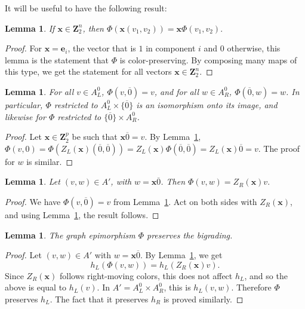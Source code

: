 \documentclass[12pt,twoside,singlespace]{article}
\numberwithin{equation}{section}
\newtheorem{lem}[equation]{Lemma}
\theoremstyle{definition}
\newcommand{\ZZ}{\mathbf{Z}}
\renewcommand{\vec}[1]{\mathbf{#1}}
\begin{document}
It will be useful to have the following result:
\begin{lem}
\label{lem:gphi}
If $\vec{x}\in \ZZ_2^n$, then $\Phi(\vec{x}(v_1,v_2))=\vec{x}\Phi(v_1,v_2).$
\end{lem}
\begin{proof}
For $\vec{x}=\vec{e}_i$, the vector that is $1$ in component $i$ and $0$ otherwise, this lemma is the statement that $\Phi$ is color-preserving.  By composing many maps of this type, we get the statement for all vectors $\vec{x}\in \ZZ_2^n$.
\end{proof}

\begin{lem}
\label{lem:phisides}
For all $v\in A_L^0$, $\Phi(v,\overline{0})=v$, and for all $w\in A_R^0$, $\Phi(\overline{0},w)=w$.  In particular, $\Phi$ restricted to $A_L^0\times\{\overline{0}\}$ is an isomorphism onto its image, and likewise for $\Phi$ restricted to $\{\overline{0}\}\times A_R^0$.
\end{lem}
\begin{proof}
Let $\vec{x}\in \ZZ_2^p$ be such that $\vec{x}\overline{0}=v$.  By Lemma~\ref{lem:gphi}, $\Phi(v,0) = \Phi(Z_L(\vec{x})(\overline{0},\overline{0})) = Z_L(\vec{x})\Phi(\overline{0},\overline{0})=Z_L(\vec{x})\overline{0}=v$.  The proof for $w$ is similar.
\end{proof}

\begin{lem}
\label{lem:phiformula}
Let $(v,w)\in A'$, with $w=\vec{x}\overline{0}$.  Then $\Phi(v,w)=Z_R(\vec{x})v.$
\end{lem}
\begin{proof}
We have $\Phi(v,\overline{0})=v$ from Lemma~\ref{lem:phisides}.  Act on both sides with $Z_R(\vec{x})$, and using Lemma~\ref{lem:gphi}, the result follows.
\end{proof}

\begin{lem}
\label{lem:mainepibigrading}
The graph epimorphism $\Phi$ preserves the bigrading.
\end{lem}
\begin{proof}
Let $(v,w)\in A'$ with $w=\vec{x}\overline{0}$.  By Lemma~\ref{lem:phiformula}, we get
\[h_L(\Phi(v,w))=h_L(Z_R(\vec{x})v).\]
Since $Z_R(\vec{x})$ follows right-moving colors, this does not affect $h_L$, and so the above is equal to $h_L(v)$.  In $A'=A_L^0\times A_R^0$, this is $h_L(v,w)$. Therefore $\Phi$ preserves $h_L$.  The fact that it preserves $h_R$ is proved similarly.
\end{proof}
\end{document}
